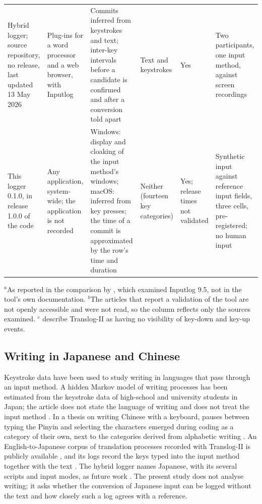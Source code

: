 \begin{landscape}
{\begin{longtable}{L{0.17}L{0.14}L{0.19}L{0.14}L{0.13}L{0.21}}
Hybrid logger; source repository, no release, last updated 13 May 2026 \citep{hylog-repo} & Plug-ins for a word processor and a web browser, with Inputlog \citep{crotti2026} & Commits inferred from keystrokes and text; inter-key intervals before a candidate is confirmed and after a conversion told apart \citep{crotti2026} & Text and keystrokes \citep{crotti2026} & Yes \citep{crotti2026} & Two participants, one input method, against screen recordings \citep{crotti2026} \\
This logger 0.1.0, in release 1.0.0 of the code \citep{release} & Any application, system-wide; the application is not recorded & Windows: display and cloaking of the input method's windows; macOS: inferred from key presses; the time of a commit is approximated by the row's time and duration & Neither (fourteen key categories) & Yes; release times not validated & Synthetic input against reference input fields, three cells, pre-registered; no human input \\
\bottomrule
\end{longtable}
\par\smallskip\noindent\footnotesize
$^{a}$As reported in the comparison by \citet{crotti2026}, which examined Inputlog 9.5, not in the tool's own
documentation.
$^{b}$The articles that report a validation of the tool are not openly accessible and were not read, so the column
reflects only the sources examined.
$^{c}$\citet{crotti2026} describe Translog-II as having no visibility of key-down and key-up events.\par
}
\end{landscape}

\subsection{Writing in Japanese and Chinese}
\label{sec:related-cjk}

Keystroke data have been used to study writing in languages that pass through an input method. A hidden Markov model
of writing processes has been estimated from the keystroke data of high-school and university students in Japan; the
article does not state the language of writing and does not treat the input method \citep{uto2020}. In a thesis on writing Chinese with a keyboard, pauses between typing the Pinyin and selecting the
characters emerged during coding as a category of their own, next to the categories derived from alphabetic writing
\citep{lu2020}. An English-to-Japanese corpus of translation processes recorded with Translog-II is publicly available
\citep{carl2016}, and its logs record the keys typed into the input method together with the text
\citep{tprdb-enja15}. The hybrid logger names Japanese, with its several scripts and input modes, as future work
\citep{crotti2026}. The present study does not analyse writing; it asks whether the conversion of Japanese input can be
logged without the text and how closely such a log agrees with a reference.

